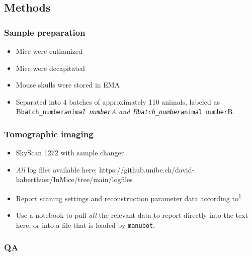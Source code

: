 \hypertarget{methods}{%
\subsection{Methods}\label{methods}}

\hypertarget{sample-preparation}{%
\subsubsection{Sample preparation}\label{sample-preparation}}

\begin{itemize}
\tightlist
\item
  Mice were euthanized
\item
  Mice were decapitated
\item
  Mouse skulls were stored in EMA
\item
  Separated into 4 batches of approximately 110 animals, labeled as B\texttt{batch\_number}\emph{\texttt{animal\ number}A and B\texttt{batch\_number}}\texttt{animal\ number}B.
\end{itemize}

\hypertarget{tomographic-imaging}{%
\subsubsection{Tomographic imaging}\label{tomographic-imaging}}

\begin{itemize}
\tightlist
\item
  SkyScan 1272 with sample changer
\item
  \emph{All} log files available here: https://github.unibe.ch/david-haberthuer/InMice/tree/main/logfiles
\item
  Report scaning settings and reconstruction parameter data according to\textsuperscript{\protect\hyperlink{ref-AFlzOIJq}{1}}
\item
  Use a notebook to pull \emph{all} the relevant data to report directly into the text here, or into a file that is loaded by \texttt{manubot}.
\end{itemize}

\hypertarget{qa}{%
\subsubsection{QA}\label{qa}}

